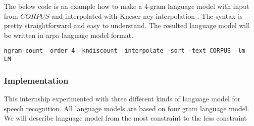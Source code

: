 The below code is an example how to make a 4-gram language model with input from $CORPUS$ and interpolated with Kneser-ney interpolation \cite{KneserNey1993}. The syntax is pretty straightforward and easy to understand. The resulted language model will be written in arpa language model format.
\begin{verbatim}
ngram-count -order 4 -kndiscount -interpolate -sort -text CORPUS -lm LM
\end{verbatim}

\subsubsection{Implementation}
\label{3LM}
This internship experimented with three different kinds of language model for speech recognition. All language models are based on four gram language model. We will describe language model from the most constraint to the less constraint
